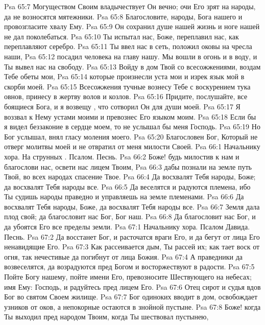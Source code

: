 \vs Psa 65:7 Могуществом Своим владычествует Он вечно; очи Его зрят на народы, да не возносятся мятежники.
\vs Psa 65:8 Благословите, народы, Бога нашего и провозгласите хвалу Ему.
\vs Psa 65:9 Он сохранил душе нашей жизнь и ноге нашей не дал поколебаться.
\vs Psa 65:10 Ты испытал нас, Боже, переплавил нас, как переплавляют серебро.
\vs Psa 65:11 Ты ввел нас в сеть, положил оковы на чресла наши,
\vs Psa 65:12 посадил человека на главу нашу. Мы вошли в огонь и в воду, и Ты вывел нас на свободу.
\vs Psa 65:13 Войду в дом Твой со всесожжениями, воздам Тебе обеты мои,
\vs Psa 65:14 которые произнесли уста мои и изрек язык мой в скорби моей.
\vs Psa 65:15 Всесожжения тучные вознесу Тебе с воскурением тука овнов, принесу в жертву волов и козлов.
\vs Psa 65:16 Придите, послушайте, все боящиеся Бога, и я возвещу , что сотворил Он для души моей.
\vs Psa 65:17 Я воззвал к Нему устами моими и превознес Его языком моим.
\vs Psa 65:18 Если бы я видел беззаконие в сердце моем, то не услышал бы меня Господь.
\vs Psa 65:19 Но Бог услышал, внял гласу моления моего.
\vs Psa 65:20 Благословен Бог, Который не отверг молитвы моей и не отвратил от меня милости Своей.
\vs Psa 66:1 Начальнику хора. На струнных . Псалом. Песнь.
\rsbpar\vs Psa 66:2 Боже! будь милостив к нам и благослови нас, освети нас лицем Твоим,
\vs Psa 66:3 дабы познали на земле путь Твой, во всех народах спасение Твое.
\vs Psa 66:4 Да восхвалят Тебя народы, Боже; да восхвалят Тебя народы все.
\vs Psa 66:5 Да веселятся и радуются племена, ибо Ты судишь народы праведно и управляешь на земле племенами.
\vs Psa 66:6 Да восхвалят Тебя народы, Боже, да восхвалят Тебя народы все.
\vs Psa 66:7 Земля дала плод свой; да благословит нас Бог, Бог наш.
\vs Psa 66:8 Да благословит нас Бог, и да убоятся Его все пределы земли.
\vs Psa 67:1 Начальнику хора. Псалом Давида. Песнь.
\rsbpar\vs Psa 67:2 Да восстанет Бог, и расточатся враги Его, и да бегут от лица Его ненавидящие Его.
\vs Psa 67:3 Как рассеивается дым, Ты рассей их; как тает воск от огня, так нечестивые да погибнут от лица Божия.
\vs Psa 67:4 А праведники да возвеселятся, да возрадуются пред Богом и восторжествуют в радости.
\vs Psa 67:5 Пойте Богу нашему, пойте имени Его, превозносите Шествующего на небесах; имя Ему: Господь, и радуйтесь пред лицем Его.
\vs Psa 67:6 Отец сирот и судья вдов Бог во святом Своем жилище.
\vs Psa 67:7 Бог одиноких вводит в дом, освобождает узников от оков, а непокорные остаются в знойной пустыне.
\vs Psa 67:8 Боже! когда Ты выходил пред народом Твоим, когда Ты шествовал пустынею,

